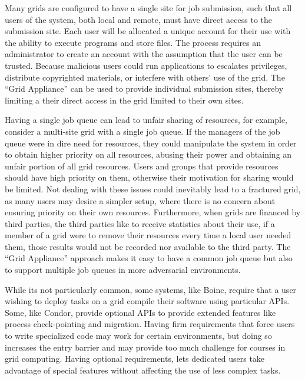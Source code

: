 \documentclass[conference]{IEEEtran}
\begin{document}
Many grids are configured to have a single site for job submission, such that
all users of the system, both local and remote, must have direct access to the
submission site.  Each user will be allocated a unique account for their use
with the ability to execute programs and store files.  The process requires an
administrator to create an account with the assumption that the user can be
trusted.  Because malicious users could run applications to escalates
privileges, distribute copyrighted materials, or interfere with others' use of
the grid.  The ``Grid Appliance'' can be used to provide individual submission
sites, thereby limiting a their direct access in the grid limited to their own
sites.

Having a single job queue can lead to unfair sharing of resources, for example,
consider a multi-site grid with a single job queue.  If the managers of the job
queue were in dire need for resources, they could manipulate the system in
order to obtain higher priority on all resources, abusing their power and
obtaining an unfair portion of all grid resources.  Users and groups that
provide resources should have high priority on them, otherwise their
motivation for sharing would be limited.  Not dealing with these issues could
inevitably lead to a fractured grid, as many users may desire a simpler setup,
where there is no concern about ensuring priority on their own resources.
Furthermore, when grids are financed by third parties, the third parties like
to receive statistics about their use, if a member of a grid were to remove
their resources every time a local user needed them, those results would not be
recorded nor available to the third party.  The ``Grid Appliance'' approach
makes it easy to have a common job queue but also to support multiple job
queues in more adversarial environments.

While its not particularly common, some systems, like Boinc, require that a
user wishing to deploy tasks on a grid compile their software using particular
APIs.  Some, like Condor, provide optional APIs to provide extended features
like process check-pointing and migration.  Having firm requirements that force
users to write specialized code may work for certain environments, but doing so
increases the entry barrier and may provide too much challenge for courses in
grid computing.  Having optional requirements, lets dedicated users take
advantage of special features without affecting the use of less complex tasks.

\addtocounter{footnote}{1}
\addtocounter{footnote}{1}
\addtocounter{footnote}{1}
\end{document}
